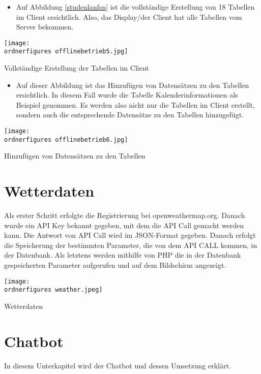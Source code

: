 \begin{itemize}
	\item Auf Abbildung \ref{studenlanfsn} ist die vollst\"andige Erstellung von 18 Tabellen im Client ersichtlich. Also, das Display/der Client hat alle Tabellen vom Server bekommen.
\end{itemize}
\begin{center}
	\captionsetup{type=figure}
	\texttt{[image: \\ordnerfigures offlinebetrieb5.jpg]}
	\caption{Vollst\"andige Erstellung der Tabellen im Client}
	\label{studenlanfsn} 
\end{center}
\begin{itemize}
	\item Auf dieser Abbildung ist das Hinzuf\"ugen von Datens\"atzen zu den Tabellen ersichtlich. In diesem Fall wurde die Tabelle Kalenderinformationen als Beispiel genommen. Es werden also nicht nur die Tabellen im Client erstellt, sondern auch die entsprechende Datens\"atze zu den Tabellen hinzugef\"ugt.
\end{itemize}
\begin{center}
	\captionsetup{type=figure}
	\texttt{[image: \\ordnerfigures offlinebetrieb6.jpg]}
	\caption{Hinzuf\"ugen von Datens\"atzen zu den Tabellen}
	\label{stuenlanfsn} 
\end{center}
\section{Wetterdaten}

Als erster Schritt erfolgte die Registrierung bei openweathermap.org. Danach wurde ein API Key bekannt gegeben, mit dem die API Call gemacht werden kann. Die Antwort von API Call wird im JSON-Format gegeben.
Danach erfolgt die Speicherung der bestimmten Parameter, die von dem API CALL kommen, in der Datenbank.
Als letztens werden mithilfe von PHP die in der Datenbank gespeicherten Parameter aufgerufen und auf dem Bildschirm angezeigt.

\begin{center}
	\captionsetup{type=figure}
	\texttt{[image: \\ordnerfigures weather.jpeg]}
	\caption{Wetterdaten}
	\label{Wetter} 
	\captionsetup{type=figure} 
\end{center}	
\section{Chatbot}
In diesem Unterkapitel wird der Chatbot und dessen Umsetzung erklärt.
